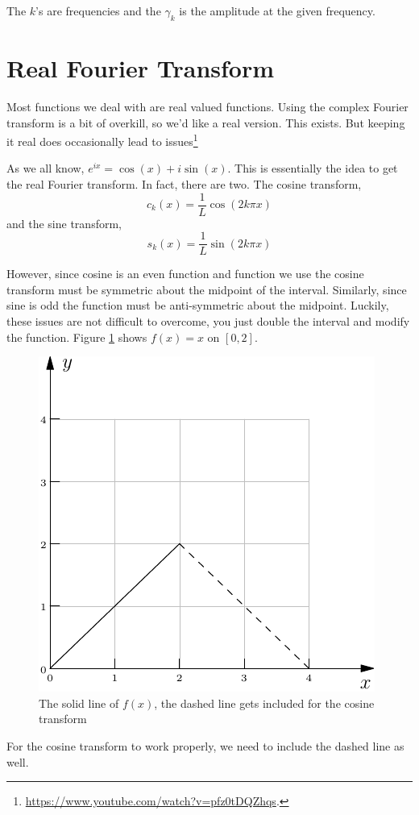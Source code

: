 \documentclass[11pt,letterpaper]{article}
\begin{document}
The $k$'s are frequencies and the $\gamma_k$ is the amplitude at the given frequency.



\section{Real Fourier Transform}

Most functions we deal with are real valued functions. Using the complex Fourier transform is a 
bit of overkill, so we'd like a real version. This exists. But keeping it real does occasionally
lead to issues\footnote{\url{https://www.youtube.com/watch?v=pfz0tDQZhqs}.}


As we all know, $e^{ix} = \cos(x) + i\sin(x)$. This is essentially the idea to get the real Fourier
transform. In fact, there are two. The cosine transform,
\[
 c_k(x) = \frac{1}{L}\cos\left(2k\pi x\right)
\]
and the sine transform,
\[
 s_k(x) = \frac{1}{L} \sin\left(2k\pi x\right)
\]

However, since cosine is an even function and function we use the cosine transform must be 
symmetric about the midpoint of the interval. Similarly, since sine is odd the function must 
be anti-symmetric about the midpoint. Luckily, these issues are not difficult to overcome, you just
double the interval and modify the function. Figure \ref{fig:even} shows $f(x)=x$ on $[0,2]$. 
\begin{figure}[!ht]
 \centering
 \includegraphics{images/even.pdf}
 \caption{The solid line of $f(x)$, the dashed line gets included for the cosine transform}
 \label{fig:even}
\end{figure}
For the cosine transform to work properly, we need to include the dashed line as well.
\end{document}
